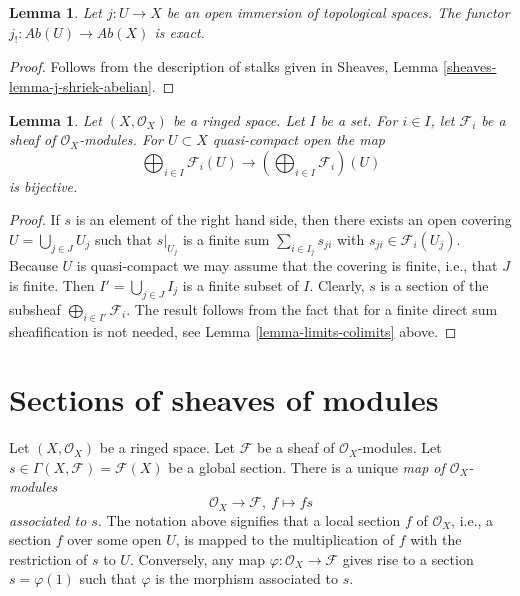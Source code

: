 \documentclass{stacks-project}
\theoremstyle{plain}
\newtheorem{lemma}[subsection]{Lemma}
\theoremstyle{definition}
\theoremstyle{remark}
\numberwithin{equation}{subsection}
\begin{document}
\begin{lemma}
\label{lemma-j-shriek-exact}
Let $j : U \to X$ be an open immersion of topological spaces.
The functor $j_! : \textit{Ab}(U) \to \textit{Ab}(X)$
is exact.
\end{lemma}

\begin{proof}
Follows from the description of stalks
given in Sheaves, Lemma \ref{sheaves-lemma-j-shriek-abelian}.
\end{proof}

\begin{lemma}
\label{lemma-section-direct-sum-quasi-compact}
Let $(X, \mathcal{O}_X)$ be a ringed space.
Let $I$ be a set. For $i \in I$, let $\mathcal{F}_i$
be a sheaf of $\mathcal{O}_X$-modules.
For $U \subset X$ quasi-compact open the map
$$
\bigoplus\nolimits_{i \in I} \mathcal{F}_i(U)
\longrightarrow
\left(\bigoplus\nolimits_{i \in I} \mathcal{F}_i\right)(U)
$$
is bijective.
\end{lemma}

\begin{proof}
If $s$ is an element of the right hand side, then
there exists an open covering $U = \bigcup_{j \in J} U_j$
such that $s|_{U_j}$ is a finite sum
$\sum_{i \in I_j} s_{ji}$ with $s_{ji} \in \mathcal{F}_i(U_j)$.
Because $U$ is quasi-compact we may assume that the
covering is finite, i.e., that $J$ is finite.
Then $I' = \bigcup_{j \in J} I_j$ is a finite subset of
$I$. Clearly, $s$ is a section of the subsheaf
$\bigoplus_{i \in I'} \mathcal{F}_i$. The result follows
from the fact that for a finite direct sum sheafification
is not needed, see Lemma \ref{lemma-limits-colimits} above.
\end{proof}



\section{Sections of sheaves of modules}
\label{section-sections}

\noindent
Let $(X, \mathcal{O}_X)$ be a ringed space.
Let $\mathcal{F}$ be a sheaf of $\mathcal{O}_X$-modules.
Let $s \in \Gamma(X, \mathcal{F}) = \mathcal{F}(X)$ be a
global section. There is a unique {\it map of $\mathcal{O}_X$-modules}
$$
\mathcal{O}_X \longrightarrow \mathcal{F}, \ f \longmapsto fs
$$
{\it associated to $s$}. The notation above signifies that a local
section $f$ of $\mathcal{O}_X$, i.e., a section $f$ over some open $U$,
is mapped to the multiplication of $f$ with the restriction of $s$ to
$U$. Conversely, any map $\varphi : \mathcal{O}_X \to \mathcal{F}$
gives rise to a section $s = \varphi(1)$ such that $\varphi$ is
the morphism associated to $s$.
\end{document}
